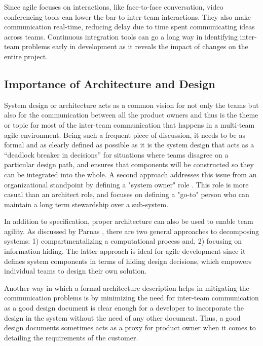 Since agile focuses on interactions, like face-to-face conversation, video conferencing tools can lower the bar to inter-team interactions.
They also make communication real-time, reducing delay due to time spent communicating ideas across teams.
Continuous integration tools can go a long way in identifying inter-team problems early in development
as it reveals the impact of changes on the entire project.


\subsection{Importance of Architecture and Design}\label{sec:imp_of_dsgn}

System design or architecture acts as a common vision for not only the teams but also for the communication between all the product owners and thus is the theme or topic for most of the inter-team communication that happens in a multi-team agile environment.
Being such a frequent piece of discussion, it needs to be as formal and as clearly defined as possible as it is the system design that acts as a “deadlock breaker in decisions” \cite{architecureRole_article} for situations where teams disagree on a particular design path, and ensures that components will be constructed so they can be integrated into the whole.
A second approach addresses this issue from an organizational standpoint by defining a "system owner" role \cite{kniberg12}.
This role is more casual than an architect role, and focuses on defining a "go-to" person who can maintain a long term stewardship over a sub-system. 

In addition to specification, proper architecture can also be used to enable team agility.
As discussed by Parnas \cite{Parnas72}, there are two general approaches to decomposing systems: 1) compartmentalizing a computational process and, 2) focusing on information hiding.
The latter approach is ideal for agile development since it defines system components in terms of hiding design decisions, which empowers individual teams to design their own solution.

Another way in which a formal architecture description helps in mitigating the communication problems is by minimizing the need for inter-team communication as a good design document is clear enough for a developer to incorporate the design in the system without the need of any other document.
Thus, a good design documents sometimes acts as a proxy for product owner when it comes to detailing the requirements of the customer.
